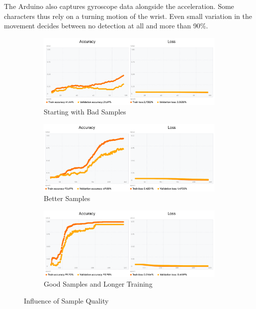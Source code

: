 \documentclass[a4paper,titlepage]{article}
\begin{document}
The Arduino also captures gyroscope data alongside the acceleration.
Some characters thus rely on a turning motion of the wrist.
Even small variation in the movement decides between no detection at all and more than 90\%.

\begin{figure}[H]
    \begin{subfigure}[b]{\linewidth}
        \includegraphics[width=\linewidth]{train_1.png}
        \caption{Starting with Bad Samples}
    \end{subfigure}
    \begin{subfigure}[b]{\linewidth}
        \includegraphics[width=\linewidth]{train_2.png}
        \caption{Better Samples}
    \end{subfigure}
    \begin{subfigure}[b]{\linewidth}
        \includegraphics[width=\linewidth]{train_3.png}
        \caption{Good Samples and Longer Training}
    \end{subfigure}
    \caption{Influence of Sample Quality}
\end{figure}
\end{document}
